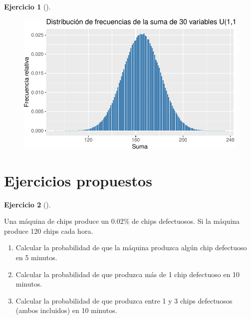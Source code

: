 \documentclass[
  a4paper,
]{scrreport}
\theoremstyle{definition}
\newtheorem{exercise}{Ejercicio}[chapter]
\theoremstyle{remark}
\begin{document}
\begin{exercise}[]
\begin{enumerate}
\begin{tcolorbox}
  \begin{figure}[H]

  {\centering \includegraphics{06-distribuciones-probabilidad_files/figure-pdf/unnamed-chunk-35-1.pdf}

  }

  \end{figure}

  \end{tcolorbox}
\end{enumerate}

\end{exercise}

\hypertarget{ejercicios-propuestos-4}{%
\section{Ejercicios propuestos}\label{ejercicios-propuestos-4}}

\begin{exercise}[]\protect\hypertarget{exr-distribuciones-probabilidad-7}{}\label{exr-distribuciones-probabilidad-7}

Una máquina de chips produce un 0.02\% de chips defectuosos. Si la
máquina produce 120 chips cada hora.

\begin{enumerate}
\def\labelenumi{\alph{enumi}.}
\item
  Calcular la probabilidad de que la máquina produzca algún chip
  defectuoso en 5 minutos.
\item
  Calcular la probabilidad de que produzca más de 1 chip defectuoso en
  10 minutos.
\item
  Calcular la probabilidad de que produzca entre 1 y 3 chips defectuosos
  (ambos incluidos) en 10 minutos.
\end{enumerate}

\end{exercise}
\end{document}
